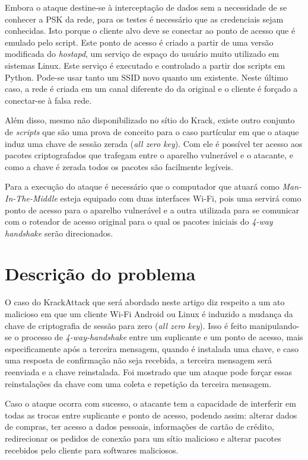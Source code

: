 \documentclass[12pt]{article}
\begin{document}
Embora o ataque destine-se à interceptação de dados sem a necessidade de se conhecer a PSK da rede, para os testes é necessário que as credenciais sejam conhecidas. Isto porque o cliente alvo deve se conectar ao ponto de acesso que é emulado pelo script. Este ponto de acesso é criado a partir de uma versão modificada do \textit{hostapd}, um serviço de espaço do usuário muito utilizado em sistemas Linux. Este serviço é executado e controlado a partir dos scripts em Python. Pode-se usar tanto um SSID novo quanto um existente. Neste último caso, a rede é criada em um canal diferente do da original e o cliente é forçado a conectar-se à falsa rede.

Além disso, mesmo não disponibilizado no sítio do Krack, existe outro conjunto de \textit{scripts} que são uma prova de conceito para o caso partícular em que o ataque induz uma chave de sessão zerada (\textit{all zero key}). Com ele é possível ter acesso aos pacotes criptografados que trafegam entre o aparelho vulnerável e o atacante, e como a chave é zerada todos os pacotes são facilmente legíveis.

Para a execução do ataque é necessário que o computador que atuará como \textit{Man-In-The-Middle} esteja equipado com duas interfaces Wi-Fi, pois uma servirá como ponto de acesso para o aparelho vulnerável e a outra utilizada para se comunicar com o roteador de acesso original para o qual os pacotes iniciais do \textit{4-way handshake} serão direcionados.


\section{Descrição do problema}
O caso do KrackAttack que será abordado neste artigo diz respeito a um ato malicioso em que um cliente Wi-Fi Android ou Linux é induzido a mudança da chave de criptografia de sessão para zero (\textit{all zero key}). Isso é feito manipulando-se o processo de \textit{4-way-handshake} entre um suplicante e um ponto de acesso, mais especificamente após a terceira mensagem, quando é instalada uma chave, e caso uma resposta de confirmação não seja recebida, a terceira mensagem será reenviada e a chave reinstalada. Foi mostrado que um ataque pode forçar essas reinstalações da chave com uma coleta e repetição da terceira mensagem. 

Caso o ataque ocorra com sucesso, o atacante tem a capacidade de interferir em todas as trocas entre suplicante e ponto de acesso, podendo assim: alterar dados de compras, ter acesso a dados pessoais, informações de cartão de crédito, redirecionar os pedidos de conexão para um sítio malicioso e alterar pacotes recebidos pelo cliente para softwares maliciosos. 
\end{document}
